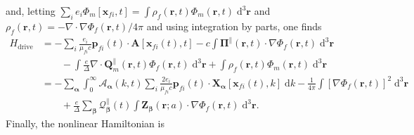 \documentclass{article}
\begin{document}
and, letting $\sum_ie_i\Phi_m[\mathbf{x}_{fi},t] = \int\rho_f(\mathbf{r},t)\Phi_m(\mathbf{r},t)\;\mathrm{d}^3\mathbf{r}$ and $\rho_f(\mathbf{r},t) = -\nabla\cdot\nabla\Phi_f(\mathbf{r},t)/4\pi$ and using integration by parts, one finds
\begin{equation}
\begin{split}
H_\mathrm{drive} &= -\sum_i\frac{e_i}{\mu_{fi}c}\mathbf{p}_{fi}(t)\cdot\mathbf{A}[\mathbf{x}_{fi}(t),t] - c\int\bm{\Pi}^\parallel(\mathbf{r},t)\cdot\nabla\Phi_f(\mathbf{r},t)\;\mathrm{d}^3\mathbf{r}\\
&\qquad - \int\frac{e}{\Delta}\nabla\cdot\mathbf{Q}_m^\parallel(\mathbf{r},t)\Phi_f(\mathbf{r},t)\;\mathrm{d}^3\mathbf{r} + \int\rho_f(\mathbf{r},t)\Phi_m(\mathbf{r},t)\;\mathrm{d}^3\mathbf{r}\\
&= -\sum_{\bm{\alpha}}\int_0^\infty\mathcal{A}_{\bm{\alpha}}(k,t)\sum_i\frac{2e_i}{\mu_{fi}c}\mathbf{p}_{fi}(t)\cdot\mathbf{X}_{\bm{\alpha}}[\mathbf{x}_{fi}(t),k]\;\mathrm{d}k - \frac{1}{4\pi}\int\left[\nabla\Phi_f(\mathbf{r},t)\right]^2\;\mathrm{d}^3\mathbf{r}\\
&\qquad + \frac{e}{\Delta}\sum_{\bm{\beta}}\mathcal{Q}_{\bm{\beta}}^\parallel(t)\int\mathbf{Z}_{\bm{\beta}}(\mathbf{r};a)\cdot\nabla\Phi_f(\mathbf{r},t)\;\mathrm{d}^3\mathbf{r}.
\end{split}
\end{equation}
Finally, the nonlinear Hamiltonian is
\end{document}
